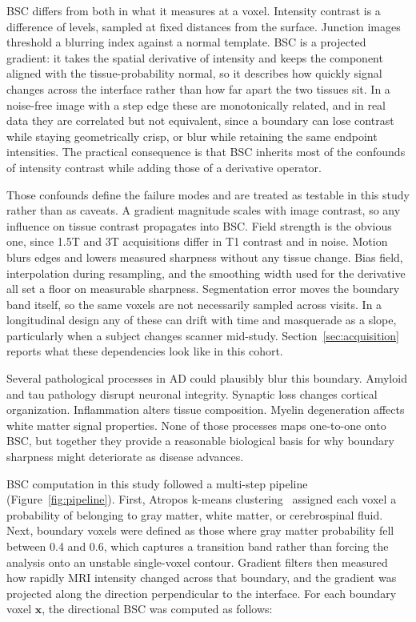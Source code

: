 \documentclass[blue]{ludusofficial}  %
\begin{document}
BSC differs from both in what it measures at a voxel. Intensity contrast is a difference of levels, sampled at fixed distances from the surface. Junction images threshold a blurring index against a normal template. BSC is a projected gradient: it takes the spatial derivative of intensity and keeps the component aligned with the tissue-probability normal, so it describes how quickly signal changes across the interface rather than how far apart the two tissues sit. In a noise-free image with a step edge these are monotonically related, and in real data they are correlated but not equivalent, since a boundary can lose contrast while staying geometrically crisp, or blur while retaining the same endpoint intensities. The practical consequence is that BSC inherits most of the confounds of intensity contrast while adding those of a derivative operator.

Those confounds define the failure modes and are treated as testable in this study rather than as caveats. A gradient magnitude scales with image contrast, so any influence on tissue contrast propagates into BSC. Field strength is the obvious one, since 1.5T and 3T acquisitions differ in T1 contrast and in noise. Motion blurs edges and lowers measured sharpness without any tissue change. Bias field, interpolation during resampling, and the smoothing width used for the derivative all set a floor on measurable sharpness. Segmentation error moves the boundary band itself, so the same voxels are not necessarily sampled across visits. In a longitudinal design any of these can drift with time and masquerade as a slope, particularly when a subject changes scanner mid-study. Section~\ref{sec:acquisition} reports what these dependencies look like in this cohort.

Several pathological processes in AD could plausibly blur this boundary. Amyloid and tau pathology disrupt neuronal integrity. Synaptic loss changes cortical organization. Inflammation alters tissue composition. Myelin degeneration affects white matter signal properties. None of those processes maps one-to-one onto BSC, but together they provide a reasonable biological basis for why boundary sharpness might deteriorate as disease advances.

BSC computation in this study followed a multi-step pipeline (Figure~\ref{fig:pipeline}). First, Atropos k-means clustering~\cite{avants2011atropos} assigned each voxel a probability of belonging to gray matter, white matter, or cerebrospinal fluid. Next, boundary voxels were defined as those where gray matter probability fell between 0.4 and 0.6, which captures a transition band rather than forcing the analysis onto an unstable single-voxel contour. Gradient filters then measured how rapidly MRI intensity changed across that boundary, and the gradient was projected along the direction perpendicular to the interface. For each boundary voxel $\mathbf{x}$, the directional BSC was computed as follows:
\end{document}
